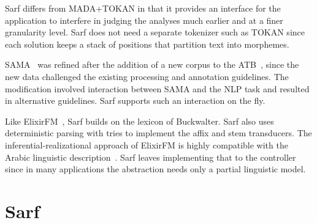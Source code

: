 \documentclass[11pt]{article}
\begin{document}
Sarf differs from MADA+TOKAN in that it provides an interface for the 
application to interfere in judging the analyses much earlier and
at a finer granularity level. 
Sarf does not need a separate tokenizer such as
TOKAN since each solution keeps a stack of positions
that partition text into morphemes.



SAMA~\cite{Maamouri:10} was refined after the addition of a new corpus to 
the ATB~\cite{Maamouri:04}, since the new data challenged the existing processing and 
annotation guidelines.
The modification involved interaction between SAMA and the NLP 
task and resulted in alternative guidelines. 
Sarf supports such an interaction on the fly.


Like ElixirFM~\cite{Otakar:07}, Sarf builds on the lexicon
of Buckwalter. %
Sarf also uses deterministic parsing with tries 
to implement the affix and stem transducers. 
The inferential-realizational approach 
of ElixirFM
is highly compatible with the Arabic linguistic 
description~\cite{Badawi:04}.
Sarf leaves implementing that to the %
controller
since in many applications the abstraction needs only a partial 
linguistic model. 


\section{Sarf}
\label{sec:sarf}

\end{document}
